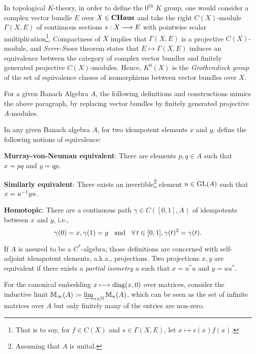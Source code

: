 In topological $K$-theory, in order to define the $0^{\underline{\text{th}}}$ $K$ group, one would consider a complex vector bundle $E$ over $X \in \boldsymbol{\operatorname{CHaus}}$ and take the right $C(X)$-module $\Gamma(X,E)$ of continuous sections $s:X\longrightarrow E$ with pointwise scalar multiplication\footnote{That is to say, for $f\in C(X)$ and $s\in \Gamma(X,E)$, let $x\longmapsto s(x)f(x)$.}. Compactness of $X$ implies that $\Gamma(X,E)$ is a projective $C(X)$-module, and \textit{Serre-Swan} theorem  \cite[Thr. 6.18]{karoubi2008k} states that $E\longmapsto \Gamma(X,E)$ induces an equivalence between the category of complex vector bundles and finitely generated projective $C(X)$-modules. Hence, $K^0(X)$ is the \textit{Grothendieck group} of the set of equivalence classes of isomorphisms between vector bundles over $X$.

For a given Banach Algebra $A$, the following definitions and constructions mimics the above paragraph, by replacing vector bundles by finitely generated projective $A$-modules. 

\begin{definicao}
\label{def: idempotentes equivalentes}
In any given Banach algebra $A$, for two idempotent elements $x$ and $y$, define the following notions of equivalence: 
\begin{itroman}
\item \textbf{Murray-von-Neuman equivalent}: There are elements $p,q\in A$ such that $x=pq$ and $y=qp$.
\item \textbf{Similarly equivalent}: There exists an invertible\footnote{Assuming that $A$ is unital.} element $u\in \operatorname{GL}(A)$ such that $x = {u}^{-1} y u$.
\item \textbf{Homotopic}: There are a continuous path  $\gamma \in C([0,1], A)$ of idempotents between $x$ and $y$, i.e.,
\begin{equation*}
    \gamma(0) = x, \gamma(1)=y \hspace{0.25cm}\operatorname{and}\hspace{0.25cm} \forall\,t\in [0,1], \gamma(t)^2 = \gamma(t).
\end{equation*}
\end{itroman}
If $A$ is assured to be a $C^*$-algebra, those definitions are concerned with self-adjoint idempotent elements, a.k.a., projections. Two projections $x, y$ are equivalent if there exists a \textit{partial isometry} $u$ such that $x= u^*u$ and $y=uu^*$.
\end{definicao}



For the canonical embedding $x \longmapsto \operatorname{diag}(x,0)$ over matrices, consider the inductive limit $\mathbb M_\infty(A) \coloneqq \varinjlim_{n\in \operatorname{\mathbb{N}}} \mathbb M_n(A)$, which can be seen as the set of infinite matrices over $A$ but only finitely many of the entries are non-zero. 

